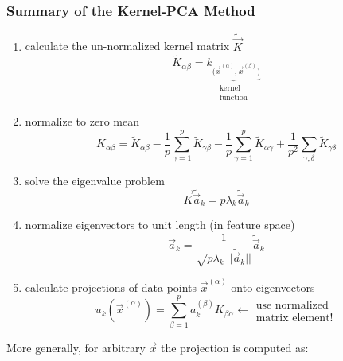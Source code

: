 \subsubsection{Summary of the Kernel-PCA Method}
\begin{enumerate}[(1)]
\item calculate the un-normalized kernel matrix $\widetilde{\vec{K}}$
\begin{equation}
	\widetilde{K}_{\alpha \beta} = \underbrace{ k_{\big( \vec{x}^{(\alpha)},
			\vec{x}^{(\beta)} \big)} }_{
				\substack{ 	\text{kernel} \\
						\text{function}} }
\end{equation}
\item normalize to zero mean
\begin{equation}
	K_{\alpha \beta} = \widetilde{K}_{\alpha \beta} - \frac{1}{p} 
		\sum\limits_{\gamma = 1}^p \widetilde{K}_{\gamma \beta}
		-\frac{1}{p} \sum\limits_{\gamma = 1}^p 
		\widetilde{K}_{\alpha \gamma} + \frac{1}{p^2} 
		\sum\limits_{\gamma, \delta} \widetilde{K}_{\gamma \delta}
\end{equation}
\item solve the eigenvalue problem
\begin{equation}
	\vec{K} \widetilde{\vec{a}}_k = p \lambda_k \widetilde{\vec{a}}_k
\end{equation}
\item normalize eigenvectors to unit length (in feature space)
\begin{equation}
	\vec{a}_k = \frac{1}{\sqrt{p \lambda_k} \, ||\widetilde{\vec{a}}_k||} 
			\widetilde{\vec{a}}_k
\end{equation}
\item calculate projections of data points $\vec{x}^{(\alpha)}$ onto eigenvectors
\begin{equation}
	u_k(\vec{x}^{(\alpha)}) = \sum\limits_{\beta = 1}^p a_k^{(\beta)} 
		K_{\beta \alpha} \leftarrow 
			\substack{	\text{use normalized} \\
					\text{matrix element!}}
\end{equation}
\end{enumerate}

More generally, for arbitrary $\vec{x}$ the projection is computed as:

